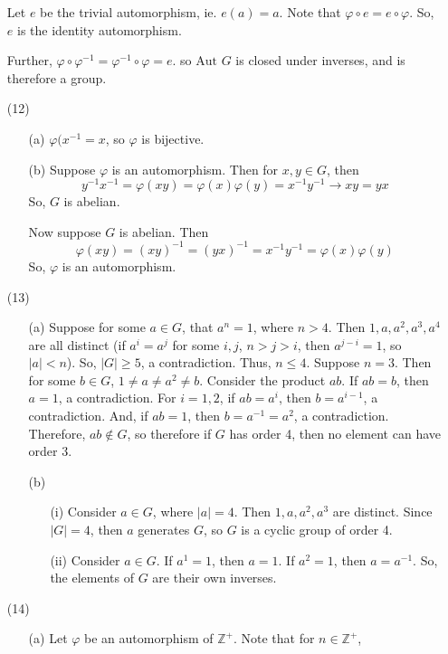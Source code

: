 \documentclass[12pt]{article}
\begin{document}
\begin{itemize}
Let $e$ be the trivial automorphism, ie. $e(a) = a$. Note that $\varphi \circ e = e \circ \varphi$. So, $e$ is the identity automorphism.

Further, $\varphi \circ \varphi^{-1} = \varphi^{-1} \circ \varphi = e$. so $\text{Aut }G$ is closed under inverses, and is therefore a group.
\item[(12)]
\begin{itemize}
\item[(a)]
$\varphi(x^{-1} = x$, so $\varphi$ is bijective.
\item[(b)]
Suppose $\varphi$ is an automorphism. Then for $x, y \in G$, then
$$y^{-1}x^{-1} = \varphi(xy) = \varphi(x)\varphi(y) = x^{-1}y^{-1} \rightarrow xy = yx$$
So, $G$ is abelian.

Now suppose $G$ is abelian. Then
$$\varphi(xy) = (xy)^{-1} = (yx)^{-1} = x^{-1}y^{-1} = \varphi(x)\varphi(y)$$
So, $\varphi$ is an automorphism.
\end{itemize}
\item[(13)]
\begin{itemize}
\item[(a)]
Suppose for some $a \in G$, that $a^n = 1$, where $n > 4$. Then $1, a, a^2, a^3, a^4$ are all distinct (if $a^i = a^j$ for some $i, j$, $n > j > i$, then $a^{j - i} = 1$, so $|a| < n$). So, $|G| \geq 5$, a contradiction. Thus, $n \leq 4$. Suppose $n = 3$. Then for some $b \in G$, $1 \neq a \neq a^2 \neq b$. Consider the product $ab$. If $ab = b$, then $a = 1$, a contradiction. For $i = 1,2$, if $ab = a^i$, then $b = a^{i - 1}$, a contradiction. And, if $ab = 1$, then $b = a^{-1} = a^2$, a contradiction. Therefore, $ab \not \in G$, so therefore if $G$ has order 4, then no element can have order 3.
\item[(b)]
\begin{itemize}
\item[(i)]
Consider $a \in G$, where $|a| = 4$. Then $1, a, a^2, a^3$ are distinct. Since $|G| = 4$, then $a$ generates $G$, so $G$ is a cyclic group of order 4.
\item[(ii)]
Consider $a \in G$. If $a^1 = 1$, then $a = 1$. If $a^2 = 1$, then $a = a^{-1}$. So, the elements of $G$ are their own inverses.
\end{itemize}
\end{itemize}
\item[(14)]
\begin{itemize}
\item[(a)]
Let $\varphi$ be an automorphism of $\mathbb{Z}^+$. Note that for $n \in \mathbb{Z}^+$,

\end{itemize}
\end{itemize}
\end{document}
